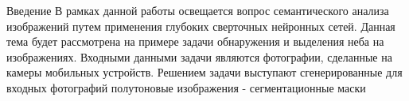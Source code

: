 
\begin{frame}{Введение}
В рамках данной работы освещается вопрос семантического анализа изображений путем применения глубоких сверточных нейронных сетей.
Данная тема будет рассмотрена на примере задачи обнаружения и выделения неба на изображениях.
Входными данными задачи являются фотографии, сделанные на камеры мобильных устройств.
Решением задачи выступают сгенерированные для входных фотографий полутоновые изображения - сегментационные маски
\end{frame}
